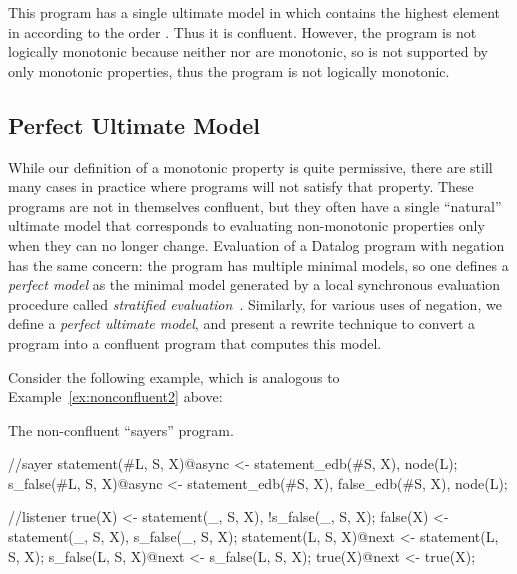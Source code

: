 
This program has a single ultimate model in which  contains the highest
element in  according to the order \dedalus{<}.
Thus it is confluent.  However, the program is not logically monotonic because neither  nor  are monotonic, so  is not supported by only monotonic properties, thus the program is not logically monotonic.

\subsection{Perfect Ultimate Model}

While our definition of a monotonic property is quite permissive, there are still many cases in practice where programs will not satisfy that property.  These programs are not in themselves confluent, but they often have a single ``natural'' ultimate model that corresponds to evaluating non-monotonic properties only when they can no longer change.  Evaluation of a Datalog program with negation has the same concern: the program has multiple minimal models, so one defines a {\em perfect model} as the minimal model generated by a local synchronous evaluation procedure called {\em stratified evaluation}~\cite{ullmanbook}.
% 
% 
Similarly, for various uses of negation, we define a {\em perfect ultimate model}, and present a rewrite technique to convert a \lang program into a confluent program that computes this model.

Consider the following example, which is analogous to Example~\ref{ex:nonconfluent2} above:

\begin{example}
\label{ex:sayers}
The non-confluent ``sayers'' program.

\begin{Dedalus}
//sayer
statement(#L, S, X)@async <- statement_edb(#S, X),
                             node(L);
s_false(#L, S, X)@async <- statement_edb(#S, X),
                           false_edb(#S, X),
                           node(L);

//listener
true(X) <- statement(_, S, X), !s_false(_, S, X);
false(X) <- statement(_, S, X), s_false(_, S, X);
statement(L, S, X)@next <- statement(L, S, X);
s_false(L, S, X)@next <- s_false(L, S, X);
true(X)@next <- true(X);
\end{Dedalus}
\end{example}

